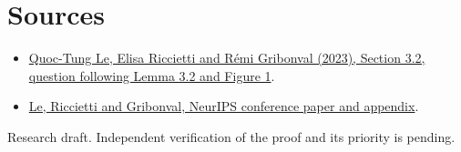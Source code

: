 \documentclass[11pt]{article}
\begin{document}
\section*{Sources}
\begin{itemize}
\item \href{https://arxiv.org/abs/2306.02666}{Quoc-Tung Le, Elisa Riccietti and R\'emi Gribonval (2023), Section 3.2, question following Lemma 3.2 and Figure 1}.
\item \href{https://proceedings.neurips.cc/paper_files/paper/2023/file/cdda0657a9f32bc7ddd4343686e7371e-Paper-Conference.pdf}{Le, Riccietti and Gribonval, NeurIPS conference paper and appendix}.
\end{itemize}
{\small Research draft. Independent verification of the proof and its priority is pending.}
\end{document}
